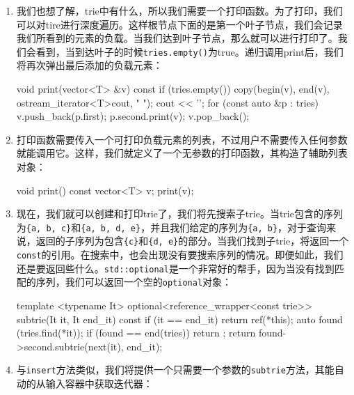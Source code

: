 \begin{enumerate}
\item 我们也想了解，trie中有什么，所以我们需要一个打印函数。为了打印，我们可以对tire进行深度遍历。这样根节点下面的是第一个叶子节点，我们会记录我们所看到的元素的负载。当我们达到叶子节点，那么就可以进行打印了。我们会看到，当到达叶子的时候\texttt{tries.empty()}为true。递归调用print后，我们将再次弹出最后添加的负载元素：

\begin{codebox}[cpp]
void print(vector<T> &v) const {
    if (tries.empty()) {
        copy(begin(v), end(v),
            ostream_iterator<T>{cout, " "});
        cout << '\n';
    }
    for (const auto &p : tries) {
        v.push_back(p.first);
        p.second.print(v);
        v.pop_back();
    }
}
\end{codebox}

\item 打印函数需要传入一个可打印负载元素的列表，不过用户不需要传入任何参数就能调用它。这样，我们就定义了一个无参数的打印函数，其构造了辅助列表对象：

\begin{codebox}[cpp]
    void print() const {
        vector<T> v;
        print(v);
    } 
\end{codebox}

\item 现在，我们就可以创建和打印trie了，我们将先搜索子trie。当trie包含的序列为\texttt{\{a, b, c\}}和\texttt{\{a, b, d, e\}}，并且我们给定的序列为\texttt{\{a, b\}}，对于查询来说，返回的子序列为包含\texttt{\{c\}}和\texttt{\{d, e\}}的部分。当我们找到子trie，将返回一个\texttt{const}的引用。在搜索中，也会出现没有要搜索序列的情况。即便如此，我们还是要返回些什么。\texttt{std::optional}是一个非常好的帮手，因为当没有找到匹配的序列，我们可以返回一个空的\texttt{optional}对象：

\begin{codebox}[cpp]
template <typename It>
optional<reference_wrapper<const trie>>
subtrie(It it, It end_it) const {
    if (it == end_it) { return ref(*this); }
    auto found (tries.find(*it));
    if (found == end(tries)) { return {}; }
    return found->second.subtrie(next(it), end_it);
}
\end{codebox}

\item 与\texttt{insert}方法类似，我们将提供一个只需要一个参数的\texttt{subtrie}方法，其能自动的从输入容器中获取迭代器：

\begin{codebox}[cpp]
    template <typename C>
    auto subtrie(const C &c) {
        return subtrie(begin(c), end(c));
    }
};
\end{codebox}


\end{enumerate}
